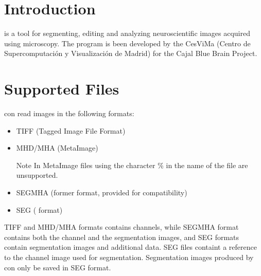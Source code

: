 \section{Introduction}

\espina{} is a tool for segmenting, editing and analyzing neuroscientific images acquired using microscopy.
The program is been developed by the CesViMa (Centro de Supercomputación y Visualización de Madrid)
for the Cajal Blue Brain Project.

\section{Supported Files}
\espina{} con read images in the following formats:
\begin{itemize}
  \item TIFF (Tagged Image File Format)
  \item MHD/MHA (MetaImage)\\
\begin{bclogo}[couleur = yellow!33, logo=\bcattention]
{Note} In MetaImage files using the character \% in the name of the file are unsupported.
\end{bclogo}
  \item SEGMHA (former \espina{} format, provided for compatibility)
  \item SEG (\espina{} format)
\end{itemize}
TIFF and MHD/MHA formats contains channels, while SEGMHA format contains both the channel and the
segmentation images, and SEG formats contain segmentation images and additional data. SEG 
files containt a reference to the channel image used for segmentation. Segmentation images
produced by \espina{} con only be saved in SEG format.
